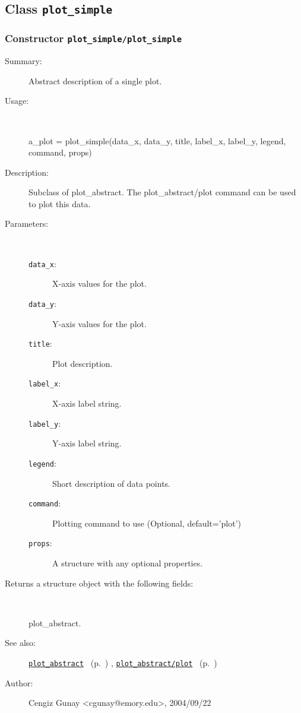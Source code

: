 \subsection{Class \texttt{plot\_simple}}%
%
\label{ref_plot_simple}%
\hypertarget{ref_plot_simple}{}%
\subsubsection[Constructor \texttt{plot\_simple}]{Constructor \texttt{plot\_simple/plot\_simple}}%
%
\label{ref_plot_simple__plot_simple}%
\hypertarget{ref_plot_simple__plot_simple}{}%
\begin{description}
\item[Summary:]Abstract description of a single plot.
%
\item[Usage:]~%
\begin{lyxcode}%
a\_plot = plot\_simple(data\_x, data\_y, title, 
		       label\_x, label\_y, legend, command, props)
%
\end{lyxcode}%
%
\item[Description:]%
Subclass of plot\_abstract. The plot\_abstract/plot command can be used to
 plot this data.
\item[Parameters:]~
\begin{description}%
\item[\texttt{data\_x}:]
 X-axis values for the plot.
\item[\texttt{data\_y}:]
 Y-axis values for the plot.
\item[\texttt{title}:]
 Plot description.
\item[\texttt{label\_x}:]
 X-axis label string.
\item[\texttt{label\_y}:]
 Y-axis label string.
\item[\texttt{legend}:]
 Short description of data points.
\item[\texttt{command}:]
 Plotting command to use (Optional, default='plot')
\item[\texttt{props}:]
 A structure with any optional properties.
\end{description}%
%
\item[Returns a structure object with the following fields:
]~

	plot\_abstract.
%
%
\item[See also:]%
\hyperlink{ref_plot_abstract}{\texttt{plot\_abstract}}%
\ (p.~\pageref{ref_plot_abstract})%
%
, \hyperlink{ref_plot_abstract__plot}{\texttt{plot\_abstract/plot}}%
\ (p.~\pageref{ref_plot_abstract__plot})%
%
%
\item[Author:]%
Cengiz Gunay <cgunay@emory.edu>, 2004/09/22
%
\end{description}
\methodline%
